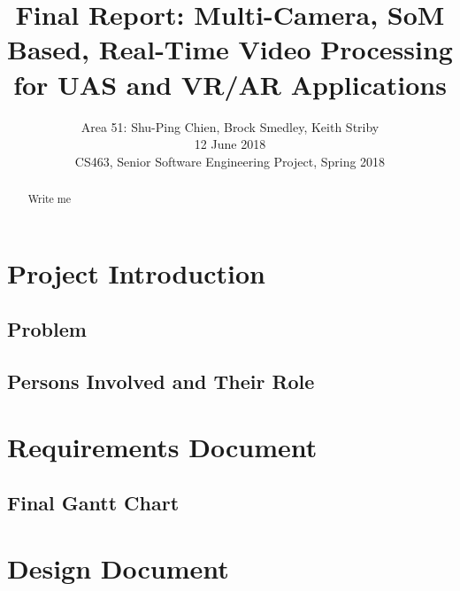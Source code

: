 \documentclass[letterpaper,10pt,serif,draftclsnofoot,onecolumn,compsoc,titlepage]{IEEEtran}
\title{Final Report: Multi-Camera, SoM Based, Real-Time Video Processing for UAS and VR/AR Applications}
\author{Area 51: Shu-Ping Chien, Brock Smedley, Keith Striby \\ 12 June 2018 \\ CS463, Senior Software Engineering Project, Spring 2018}
\begin{document}
\begin{titlepage}
\maketitle

\begin{abstract}

Write me \\


\thispagestyle{empty}
\end{abstract}
\end{titlepage}

\newpage
\tableofcontents

\newpage

\section{Project Introduction}

	\subsection{Problem}


	\subsection{Persons Involved and Their Role}


\newpage

\section{Requirements Document}

	
\newpage

\subsection{Final Gantt Chart}

	

\newpage

\section{Design Document}
\end{document}
